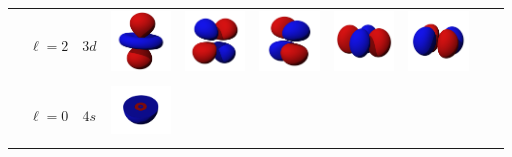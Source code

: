 \begin{landscape}
\begin{xltabular}{\linewidth}{C C C c c c c c c c}
 &  &  & 
\includegraphics[width=1.6cm]{tableau_geometrie_orbitale_modelisation/Dz2_orbital.png} 
&
\includegraphics[width=1.6cm]{tableau_geometrie_orbitale_modelisation/Dxz_orbital.png}  
&
\includegraphics[width=1.6cm]{tableau_geometrie_orbitale_modelisation/Dyz_orbital.png} 
& 
\includegraphics[width=1.6cm]{tableau_geometrie_orbitale_modelisation/Dxy_orbital.png} 
&
\includegraphics[width=1.6cm]{tableau_geometrie_orbitale_modelisation/Dx2-y2_orbital.png} 
& & \\
& & &  &  &  &  &  & &  \\ %

\addlinespace


 &  &  & 
\centering
\includegraphics[width=1.6cm]{tableau_geometrie_orbitale_modelisation/S4M0.png} 
& & & & & & \\

& & &  & & & & & &  \\ %


\end{xltabular}
\end{landscape}
